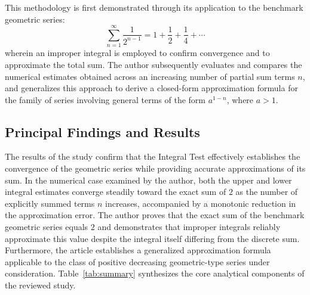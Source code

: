 \documentclass[11pt, a4paper]{article}
\begin{document}
This methodology is first demonstrated through its application to the benchmark geometric series:
\begin{equation}
    \sum_{n=1}^{\infty} \frac{1}{2^{n-1}} = 1 + \frac{1}{2} + \frac{1}{4} + \cdots
\end{equation}
wherein an improper integral is employed to confirm convergence and to approximate the total sum. The author subsequently evaluates and compares the numerical estimates obtained across an increasing number of partial sum terms $n$, and generalizes this approach to derive a closed-form approximation formula for the family of series involving general terms of the form $a^{1-n}$, where $a > 1$.

\subsection{Principal Findings and Results}

The results of the study confirm that the Integral Test effectively establishes the convergence of the geometric series while providing accurate approximations of its sum. In the numerical case examined by the author, both the upper and lower integral estimates converge steadily toward the exact sum of $2$ as the number of explicitly summed terms $n$ increases, accompanied by a monotonic reduction in the approximation error. The author proves that the exact sum of the benchmark geometric series equals $2$ and demonstrates that improper integrals reliably approximate this value despite the integral itself differing from the discrete sum. Furthermore, the article establishes a generalized approximation formula applicable to the class of positive decreasing geometric-type series under consideration. Table~\ref{tab:summary} synthesizes the core analytical components of the reviewed study.
\end{document}
